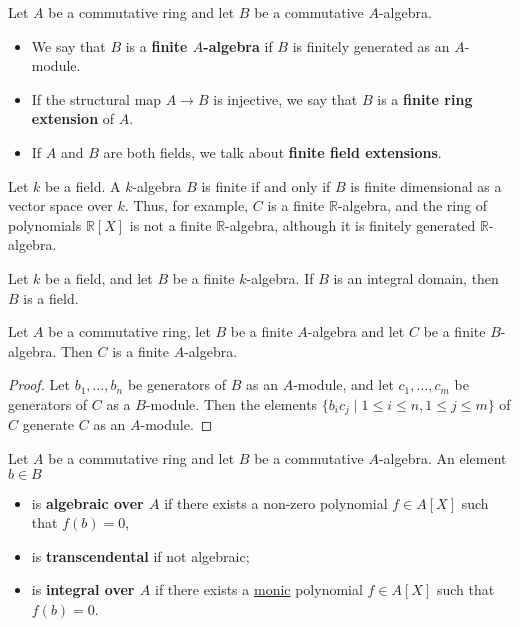 \documentclass[12pt, a4paper]{article}
\begin{document}
\begin{definition}
    Let \( A \) be a commutative ring and let \( B \) be a commutative \( A \)-algebra. 
    \begin{itemize}
        \item We say that \( B \) is a \textbf{finite \( A \)-algebra} if \( B \) is finitely generated as an \( A \)-module.
        \item If the structural map \( A \rightarrow B \) is injective, we say that \( B \) is a \textbf{finite ring extension} of \( A \).
        \item If \( A \) and \( B \) are both fields, we talk about \textbf{finite field extensions}.
    \end{itemize}
\end{definition}

\begin{mdexample}
    Let \( k \) be a field. A \( k \)-algebra \( B \) is finite if and only if \( B \) is finite dimensional as a vector space over \( k \). Thus, for example, \( C \) is a finite \( \mathbb{R} \)-algebra, and the ring of polynomials \( \mathbb{R}[X] \) is not a finite \( \mathbb{R} \)-algebra, although it is finitely generated \( \mathbb{R} \)-algebra.
\end{mdexample}

\begin{theorem}
    Let \( k \) be a field, and let \( B \) be a finite \( k \)-algebra. If \( B \) is an integral domain, then \( B \) is a field.
\end{theorem}

\begin{proposition}
    Let \( A \) be a commutative ring, let \( B \) be a finite \( A \)-algebra and let \( C \) be a finite \( B \)-algebra. Then \( C \) is a finite \( A \)-algebra.
\end{proposition}

\begin{proof}
    Let \( b_1, \ldots, b_n \) be generators of \( B \) as an \( A \)-module, and let \( c_1, \ldots, c_m \) be generators of \( C \) as a \( B \)-module. Then the elements \( \{b_i c_j \mid 1 \leq i \leq n, 1 \leq j \leq m\} \) of \( C \) generate \( C \) as an \( A \)-module.
\end{proof}

\begin{definition}
    Let \( A \) be a commutative ring and let \( B \) be a commutative \( A \)-algebra. An element \( b \in B \)
    \begin{itemize}
        \item is \textbf{algebraic over \( A \)} if there exists a non-zero polynomial \( f \in A[X] \) such that \( f(b) = 0 \),
        \item is \textbf{transcendental} if not algebraic;
        \item is \textbf{integral over \( A \)} if there exists a \ul{monic} polynomial \( f \in A[X] \) such that \( f(b) = 0 \).
    \end{itemize}
\end{definition}
\end{document}

